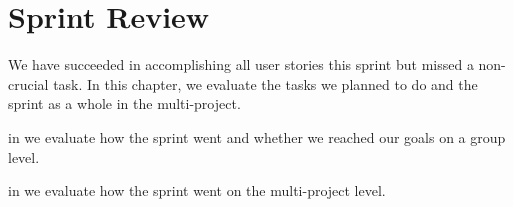 \chapter{Sprint Review}\label{chap:sprint3_end}
We have succeeded in accomplishing all user stories this sprint but missed a non-crucial task. In this chapter, we evaluate the tasks we planned to do and the sprint as a whole in the multi-project.

\begin{chapterorganization}
  \item in  we evaluate how the sprint went and whether we reached our goals on a group level.
  \item in  we evaluate how the sprint went on the multi-project level.
\end{chapterorganization}

